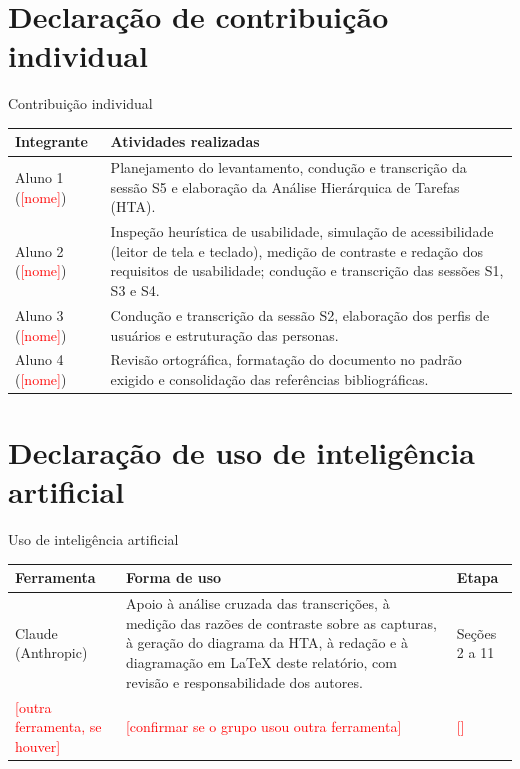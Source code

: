 \documentclass[
  12pt,
  oneside,
  a4paper,
  chapter=TITLE,
  section=TITLE,
  english,
  brazilian
]{abntex2}
\renewcommand{\fonte}[1]{\par\vspace{3pt}{\footnotesize\raggedright\noindent Fonte: #1\par}\vspace{4pt}}%
\newcommand{\preencher}[1]{\textcolor{red}{[#1]}}
\begin{document}
\chapter{Declaração de contribuição individual}\label{cap:contribuicao}

\begin{quadro}[!htbp]
  \caption{Contribuição individual}\label{qua:contribuicao}
  \centering\small
  \begin{tabularx}{\textwidth}{|l|Y|}\hline
    Integrante & Atividades realizadas \\\hline
    Aluno 1 (\preencher{nome}) & Planejamento do levantamento, condução e transcrição da sessão S5 e elaboração da Análise Hierárquica de Tarefas (HTA). \\\hline
    Aluno 2 (\preencher{nome}) & Inspeção heurística de usabilidade, simulação de acessibilidade (leitor de tela e teclado), medição de contraste e redação dos requisitos de usabilidade; condução e transcrição das sessões S1, S3 e S4. \\\hline
    Aluno 3 (\preencher{nome}) & Condução e transcrição da sessão S2, elaboração dos perfis de usuários e estruturação das personas. \\\hline
    Aluno 4 (\preencher{nome}) & Revisão ortográfica, formatação do documento no padrão exigido e consolidação das referências bibliográficas. \\\hline
  \end{tabularx}
  \fonte{Elaborado pelos autores (2026).}
\end{quadro}

\chapter{Declaração de uso de inteligência artificial}\label{cap:ia}

\begin{quadro}[!htbp]
  \caption{Uso de inteligência artificial}\label{qua:ia}
  \centering\small
  \begin{tabularx}{\textwidth}{|l|Y|l|}\hline
    Ferramenta & Forma de uso & Etapa \\\hline
    Claude (Anthropic) & Apoio à análise cruzada das transcrições, à medição das razões de contraste sobre as capturas, à geração do diagrama da HTA, à redação e à diagramação em \LaTeX{} deste relatório, com revisão e responsabilidade dos autores. & Seções 2 a 11 \\\hline
    \preencher{outra ferramenta, se houver} & \preencher{confirmar se o grupo usou outra ferramenta} & \preencher{} \\\hline
  \end{tabularx}
  \fonte{Elaborado pelos autores (2026).}
\end{quadro}
\end{document}

